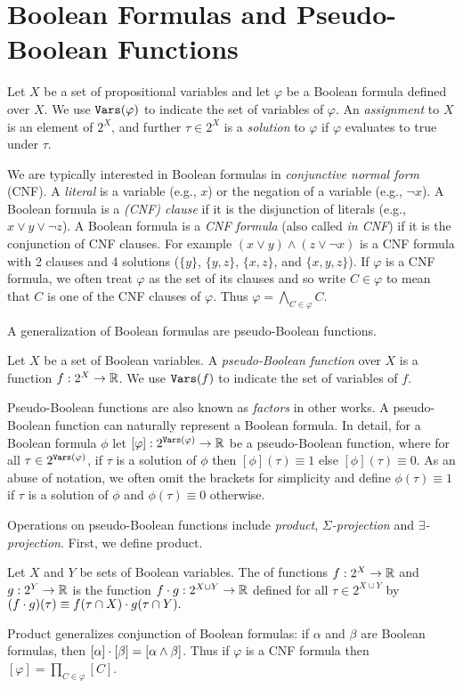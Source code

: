\section{Boolean Formulas and Pseudo-Boolean Functions}
Let $X$ be a set of propositional variables and let $\varphi$ be a Boolean formula defined over $X$.
We use $\texttt{\upshape Vars}(\varphi)$ to indicate the set of variables of $\varphi$. An \emph{assignment} to $X$ is an element of $2^X$, and further $\tau \in 2^X$ is a \emph{solution} to $\varphi$ if $\varphi$ evaluates to true under $\tau$.

We are typically interested in Boolean formulas in \emph{conjunctive normal form} (CNF).
A \emph{literal} is a variable (e.g., $x$) or the negation of a variable (e.g., $\neg x$).
A Boolean formula is a \emph{(CNF) clause} if it is the disjunction of literals (e.g., $x \lor y \lor \neg z$).
A Boolean formula is a \emph{CNF formula} (also called \emph{in CNF}) if it is the conjunction of CNF clauses.
For example $(x \lor y) \land (z \lor \neg x)$ is a CNF formula with 2 clauses and 4 solutions ($\{y\}$, $\{y, z\}$, $\{x, z\}$, and $\{x, y, z\}$).
If $\varphi$ is a CNF formula, we often treat $\varphi$ as the set of its clauses and so write $C \in \varphi$ to mean that $C$ is one of the CNF clauses of $\varphi$. Thus $\varphi = \bigwedge_{C \in \varphi} C$.

A generalization of Boolean formulas are pseudo-Boolean functions.
\begin{definition}
\label{def_pseudoboolean}
Let $X$ be a set of Boolean variables.
A \emph{pseudo-Boolean function} over $X$ is a function $f: 2^X \to \mathbb{R}$.
We use $\texttt{\upshape Vars}(f)$ to indicate the set of variables of $f$.
\end{definition}
Pseudo-Boolean functions are also known as \emph{factors} in other works.
A pseudo-Boolean function can naturally represent a Boolean formula. In detail, for a Boolean formula $\phi$ let $[\varphi]: 2^{\texttt{\upshape Vars}(\varphi)} \rightarrow \mathbb{R}$ be a pseudo-Boolean function, where for all $\tau \in 2^{\texttt{\upshape Vars}(\varphi)}$, if $\tau$ is a solution of $\phi$ then $[\phi](\tau) \equiv 1$ else $[\phi](\tau) \equiv 0$.
As an abuse of notation, we often omit the brackets for simplicity and define $\phi(\tau) \equiv 1$ if $\tau$ is a solution of $\phi$ and $\phi(\tau) \equiv 0$ otherwise.

Operations on pseudo-Boolean functions include \emph{product}, \emph{$\Sigma$-projection} and \emph{$\exists$-projection}.
First, we define product.
\begin{definition}[Product]
\label{def_mult}
    Let $X$ and $Y$ be sets of Boolean variables.
    The  of functions $f: 2^X \to \mathbb{R}$ and $g: 2^Y \to \mathbb{R}$ is the function $f \cdot g: 2^{X \cup Y} \to \mathbb{R}$ defined for all $\tau \in 2^{X \cup Y}$ by
    $(f \cdot g)(\tau) \equiv f(\tau \cap X) \cdot g(\tau \cap Y).$
\end{definition}
Product generalizes conjunction of Boolean formulas: if $\alpha$ and $\beta$ are Boolean formulas, then $[\alpha] \cdot [\beta] = [\alpha \land \beta]$. Thus if $\varphi$ is a CNF formula then $[\varphi] = \prod_{C \in \varphi} [C]$.

